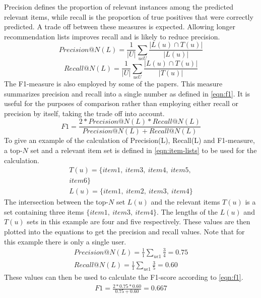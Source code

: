 Precision defines the proportion of relevant instances among the predicted relevant items, while recall is the proportion of true positives that were correctly predicted.
A trade off between these measures is expected.
Allowing longer recommendation lists improves recall and is likely to reduce precision\cite{RecommenderHandbook2015}.
\begin{equation}
    \label{eqn:precision}
    Precision@N(L) = \frac{1}{|U|} \sum\limits_{u \epsilon U}\frac{|L(u) \cap T(u)|}{|L(u)|}
\end{equation}
\begin{equation}
    \label{eqn:recall}
    Recall@N(L) = \frac{1}{|U|} \sum\limits_{u \epsilon U} \frac{|L(u) \cap T(u)|}{|T(u)|}
\end{equation}
The F1-measure is also employed by some of the papers.
This measure summarizes precision and recall into a single number as defined in \autoref{eqn:f1}.
It is useful for the purposes of comparison rather than employing either recall or precision by itself, taking the trade off into account.
\begin{equation}
    \label{eqn:f1}
    F1 = \frac{2*Precision@N(L)*Recall@N(L)}{Precision@N(L)+Recall@N(L)}
\end{equation}
To give an example of the calculation of Precision(L), Recall(L) and F1-measure, a top-$N$ set and a relevant item set is defined in \autoref{eqn:item-lists} to be used for the calculation.
\begin{align}
    T(u) = \{item1, \: item3, \: item4, \: item5,\nonumber \\
     item6\} \nonumber \\
    L(u) = \{item1, \: item2, \: item3, \: item4\}\label{eqn:item-lists}
\end{align}
The intersection between the top-$N$ set $L(u)$ and the relevant items $T(u)$ is a set containing three items $\{item1, \: item3, \: item4\}$.
The lengths of the $L(u)$ and $T(u)$ sets in this example are four and five respectively.
These values are then plotted into the equations to get the precision and recall values.
Note that for this example there is only a single user.
\begin{align*}
    Precision@N(L) = \frac{1}{1} \sum\limits_{u \epsilon 1}\frac{3}{4} = 0.75\\
    Recall@N(L) = \frac{1}{1} \sum\limits_{u \epsilon 1} \frac{3}{5} = 0.60
\end{align*}
These values can then be used to calculate the F1-score according to \autoref{eqn:f1}.
\begin{align*}
    F1 = \frac{2*0.75*0.60}{0.75+0.60} = 0.667
\end{align*}
